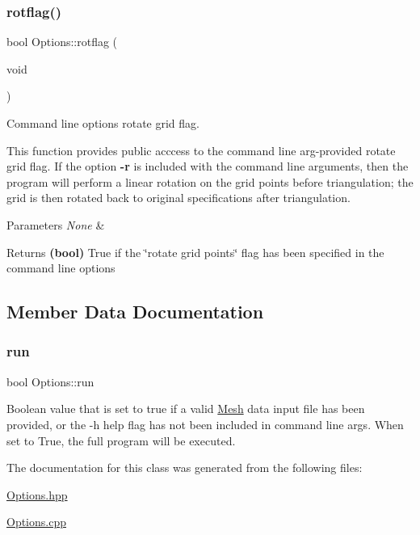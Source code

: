 \subsubsection{\texorpdfstring{rotflag()}{rotflag()}}
{\footnotesize\ttfamily bool Options\+::rotflag (\begin{DoxyParamCaption}\item[{void}]{ }\end{DoxyParamCaption})\hspace{0.3cm}{\ttfamily [inline]}}



Command line options rotate grid flag. 

This function provides public acccess to the command line arg-\/provided rotate grid flag. If the option {\bfseries -\/r} is included with the command line arguments, then the program will perform a linear rotation on the grid points before triangulation; the grid is then rotated back to original specifications after triangulation. 
\begin{DoxyParams}{Parameters}
{\em None} & \\
\hline
\end{DoxyParams}
\begin{DoxyReturn}{Returns}
{\bfseries (bool)} True if the \char`\"{}rotate grid points\char`\"{} flag has been specified in the command line options 
\end{DoxyReturn}


\subsection{Member Data Documentation}
\mbox{\label{class_options_a762a0775c9b60ceb2737dc90c96f7c0b}} 
\subsubsection{\texorpdfstring{run}{run}}
{\footnotesize\ttfamily bool Options\+::run}



Boolean value that is set to true if a valid \mbox{\hyperlink{class_mesh}{Mesh}} data input file has been provided, or the -\/h help flag has not been included in command line args. When set to True, the full program will be executed. 



The documentation for this class was generated from the following files\+:\begin{DoxyCompactItemize}
\item 
\mbox{\hyperlink{_options_8hpp}{Options.\+hpp}}\item 
\mbox{\hyperlink{_options_8cpp}{Options.\+cpp}}\end{DoxyCompactItemize}
